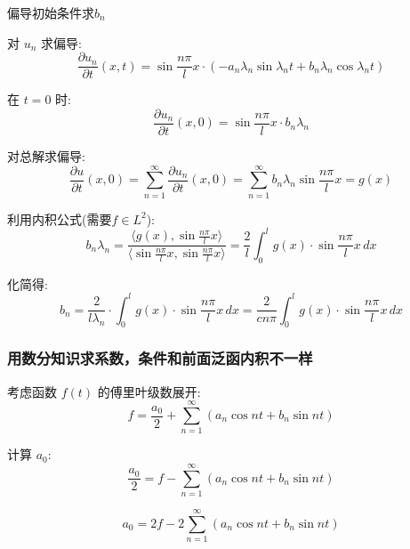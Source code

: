 \documentclass[12pt,a4paper]{article}
\numberwithin{subsection}{section}
\numberwithin{subsubsection}{subsection}
\theoremstyle{plain}
\theoremstyle{definition}
\theoremstyle{remark}
\begin{document}
	偏导初始条件求$b_n$
	
	对 \(u_n\) 求偏导:
	\begin{equation}
		\frac{\partial u_n}{\partial t}(x, t) = \sin \frac{n\pi}{l} x \cdot \left( -a_n \lambda_n \sin \lambda_n t + b_n \lambda_n \cos \lambda_n t \right)
	\end{equation}
	
	在 \(t = 0\) 时:
	\begin{equation}
		\frac{\partial u_n}{\partial t}(x, 0) = \sin \frac{n\pi}{l} x \cdot b_n \lambda_n
	\end{equation}
	
	对总解求偏导:
	\begin{equation}
		\frac{\partial u}{\partial t}(x, 0) = \sum_{n=1}^{\infty} \frac{\partial u_n}{\partial t}(x, 0) = \sum_{n=1}^{\infty} b_n \lambda_n \sin \frac{n\pi}{l} x = g(x)
	\end{equation}
	
	利用内积公式(需要$f \in L^2$):
	\begin{equation}
		b_n \lambda_n = \frac{\langle g(x), \sin \frac{n\pi}{l} x \rangle}{\langle \sin \frac{n\pi}{l} x, \sin \frac{n\pi}{l} x \rangle} = \frac{2}{l} \int_0^l g(x) \cdot \sin \frac{n\pi}{l} x \, dx
	\end{equation}
	
	化简得:
	\begin{equation}
		b_n = \frac{2}{l \lambda_n} \cdot \int_0^l g(x) \cdot \sin \frac{n\pi}{l} x \, dx = \frac{2}{c n \pi} \int_0^l g(x) \cdot \sin \frac{n\pi}{l} x \, dx
	\end{equation}
	
	\subsubsection{用数分知识求系数，条件和前面泛函内积不一样}
	
	考虑函数 \( f(t) \) 的傅里叶级数展开:
	\begin{equation}
		f = \frac{a_0}{2} + \sum_{n=1}^{\infty} \left( a_n \cos nt + b_n \sin nt \right)
	\end{equation}
	
	计算 \( a_0 \):
	\begin{equation}
		\frac{a_0}{2} = f - \sum_{n=1}^{\infty} \left( a_n \cos nt + b_n \sin nt \right)
	\end{equation}
	
	\begin{equation}
		a_0 = 2f - 2 \sum_{n=1}^{\infty} \left( a_n \cos nt + b_n \sin nt \right)
	\end{equation}
	
\end{document}
